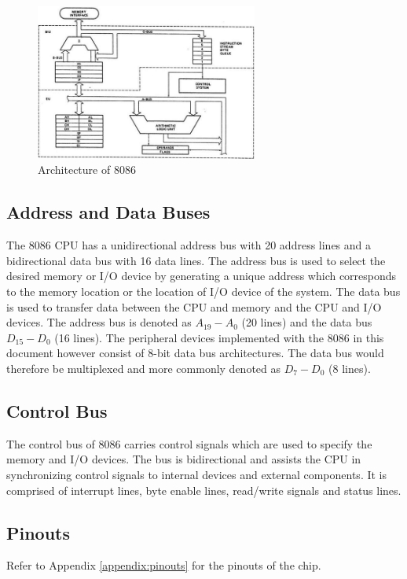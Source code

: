         \begin{figure}[h]
            \begin{center}
                \includegraphics[width=0.65\textwidth]{figures/02_8086_architecture.jpg}
                \caption{Architecture of 8086} \label{fig:8086_architecture}
            \end{center}
        \end{figure}

    \subsection{Address and Data Buses}
    The 8086 CPU has a unidirectional address bus with 20 address lines and a bidirectional data bus with 16 data lines. \cite{buses} The address bus is used to select the desired memory or I/O device by generating a unique address which corresponds to the memory location or the location of I/O device of the system. The data bus is used to transfer data between the CPU and memory and the CPU and I/O devices.\n
    The address bus is denoted as $A_{19}-A_{0}$ (20 lines) and the data bus $D_{15}-D_{0}$ (16 lines). The peripheral devices implemented with the 8086 in this document however consist of 8-bit data bus architectures. The data bus would therefore be multiplexed and more commonly denoted as $D_{7}-D_{0}$ (8 lines).

    \subsection{Control Bus}
    The control bus of 8086 carries control signals which are used to specify the memory and I/O devices. \cite{buses} The bus is bidirectional and assists the CPU in synchronizing control signals to internal devices and external components. It is comprised of interrupt lines, byte enable lines, read/write signals and status lines.

    \subsection{Pinouts}
    Refer to Appendix \ref{appendix:pinouts} for the pinouts of the chip.
